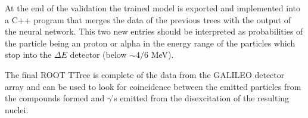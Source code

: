 At the end of the validation the trained model is exported and implemented into a C++ program that merges the data of the previous trees with the output of the neural network. This two new entries should be interpreted as probabilities of the particle being an proton or alpha in the energy range of the particles which stop into the $\Delta E$ detector (below $\sim \num{4}/\num{6}$ MeV). 

The final ROOT TTree is complete of the data from the GALILEO detector array and can be used to look for coincidence between the emitted particles from the compounds formed and $\gamma$'s emitted from the disexcitation of the resulting nuclei.





